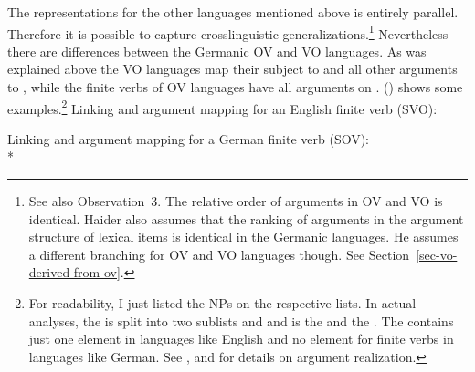 The representations for the other languages mentioned above is entirely parallel. Therefore it is
possible to capture crosslinguistic generalizations.\footnote{
  See also  Observation~3. The relative order of arguments in OV
  and VO is identical. Haider also assumes that the ranking of arguments in the argument structure
  of lexical items is identical in the Germanic languages. He assumes a different branching for OV
  and VO languages though. See Section~\ref{sec-vo-derived-from-ov}.
} Nevertheless there are differences between the
Germanic OV and VO languages. As was explained above the VO languages map their subject to \spr and
all other arguments to \comps, while the finite verbs of OV languages have all arguments on \comps. 
() shows some examples.\footnote{%
 For readability, I just listed the NPs on the respective lists. In
actual analyses, the \argstl is split into two sublists  and  and  is the
\sprl and  the \compsl. The \sprl contains just one element in languages like English and no
element for finite verbs in languages like German.
  See ,  and  for details on argument realization.
}
\eal
\ex Linking and argument mapping for an English finite verb (SVO):\\

\ex Linking and argument mapping for a German finite verb (SOV):\\*
\zl

